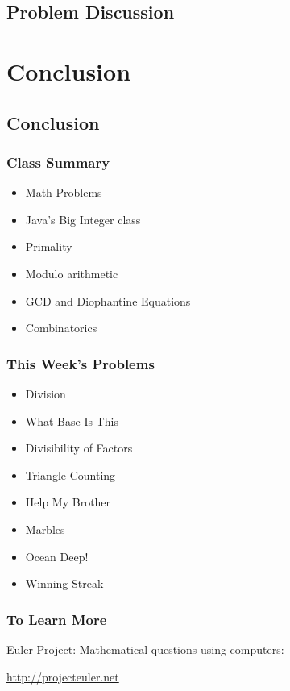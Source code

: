 \documentclass{beamer}
\begin{document}
\subsection{Problem Discussion}
\begin{frame}
  \frametitle{}
\end{frame}


\section{Conclusion}
\subsection{Conclusion}
\begin{frame}
  \frametitle{Class Summary}
  \begin{itemize}
  \item Math Problems
  \item Java's Big Integer class
  \item Primality
  \item Modulo arithmetic
  \item GCD and Diophantine Equations
  \item Combinatorics
  \end{itemize}
\end{frame}

\begin{frame}
  \frametitle{This Week's Problems}
  {\smaller
  \begin{itemize}
  \item Division
  \item What Base Is This
  \item Divisibility of Factors
  \item Triangle Counting
  \item Help My Brother
  \item Marbles
  \item Ocean Deep!
  \item Winning Streak
  \end{itemize}}
\end{frame}

\begin{frame}
  \frametitle{To Learn More}

  Euler Project: Mathematical questions using computers:

  \url{http://projecteuler.net}
\end{frame}
\end{document}
